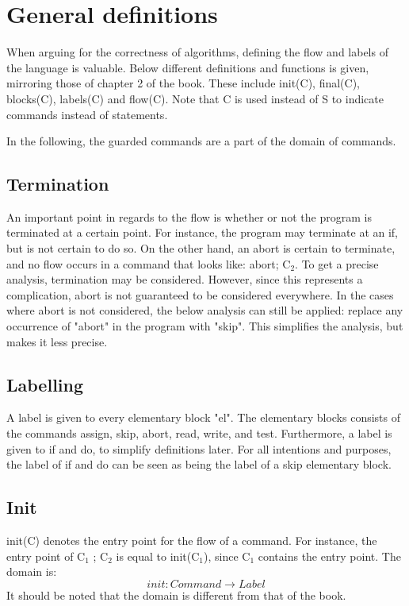 
\section{General definitions}

\docpar
When arguing for the correctness of algorithms, defining the flow and labels of the language is
valuable. Below different definitions and functions is given, mirroring those of chapter 2 of the
book. These include init(C), final(C), blocks(C), labels(C) and flow(C). Note that C is used instead
of S to indicate commands instead of statements.

In the following, the guarded commands are a part of the domain of commands.

\subsection{Termination}

An important point in regards to the flow is whether or not the program is terminated
at a certain point. For instance, the program may terminate at an if, but is not
certain to do so. On the other hand, an abort is certain to terminate, and no flow
occurs in a command that looks like: abort; C$_2$. To get a precise analysis, termination
may be considered. However, since this represents a complication, abort is not guaranteed
to be considered everywhere. In the cases where abort is not considered, the below analysis
can still be applied: replace any occurrence of "abort" in the program with "skip".
This simplifies the analysis, but makes it less precise.

\subsection{Labelling}

A label is given to every elementary block "el". The elementary blocks consists of
the commands assign, skip, abort, read, write, and test. Furthermore, a label is given
to if and do, to simplify definitions later. For all intentions and purposes, the
label of if and do can be seen as being the label of a skip elementary block.

\subsection{Init}

init(C) denotes the entry point for the flow of a command.
For instance, the entry point of C$_1$ ; C$_2$ is equal to init(C$_1$),
since C$_1$ contains the entry point. The domain is:
\[init \colon Command \to Label\]
It should be noted that the domain is different from that of the book.

